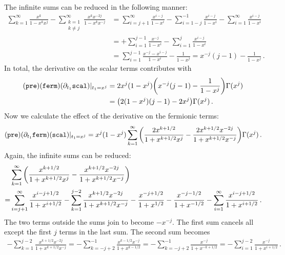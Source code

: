 \documentclass[a4paper,11pt]{article}
\begin{document}
The infinite sums can be reduced in the following manner:
\begin{equation}
\begin{split}
	\sum_{k=1}^\infty \frac{x^k}{1-x^kx^j} - \sum_{\substack{k=1\\k\neq j}}^\infty \frac{x^kx^{-2j}}{1-x^kx^{-j}}
	&= \sum_{i=j+1}^\infty \frac{x^{i-j}}{1-x^i} - \sum_{i=1-j}^{-1} \frac{x^{i-j}}{1-x^i} - \sum_{i=1}^{\infty} \frac{x^{i-j}}{1-x^i}\\
	&= + \sum_{i=1}^{j-1} \frac{x^{-j}}{1-x^i} - \sum_{i=1}^{j} \frac{x^{i-j}}{1-x^i}\\
	&= \sum_{i=1}^{j-1} \frac{x^{-j}-x^{i-j}}{1-x^i} - \frac{1}{1-x^j} = x^{-j}(j-1) - \frac{1}{1-x^j}\,.
\end{split}
\end{equation}
In total, the derivative on the scalar terms contributes with
\begin{equation}
\begin{split}
	(\mathtt{pre})(\mathtt{ferm})(\partial_{t_1}\mathtt{scal})|_{t_1=x^j}&=2x^j(1-x^j) \qty(x^{-j}(j-1) - \frac{1}{1-x^j}) \Gamma(x^j)\\
	&= \qty(2(1-x^j)(j-1) - 2x^j) \Gamma(x^j)\,.
\end{split}
\end{equation}
Now we calculate the effect of the derivative on the fermionic terms:
\begin{equation}
	(\mathtt{pre})(\partial_{t_1}\mathtt{ferm})(\mathtt{scal})|_{t_1=x^j}=x^j(1-x^j) \sum_{k=1}^\infty \qty( \frac{2x^{k+1/2}}{1+x^{k+1/2}x^j} - \frac{2x^{k+1/2}x^{-2j}}{1+x^{k+1/2}x^{-j}} )  \Gamma(x^j)\,.
\end{equation}
Again, the infinite sums can be reduced:
\begin{equation}
\begin{split}
	&\sum_{k=1}^\infty \qty( \frac{x^{k+1/2}}{1+x^{k+1/2}x^j} - \frac{x^{k+1/2}x^{-2j}}{1+x^{k+1/2}x^{-j}} )\\
	= & \sum_{i=j+1}^\infty \frac{x^{i-j+1/2}}{1+x^{i+1/2}} -  \sum_{k=1}^{j-2} \frac{x^{k+1/2}x^{-2j}}{1+x^{k+1/2}x^{-j}} - \frac{x^{-j+1/2}}{1+x^{1/2}} - \frac{x^{-j-1/2}}{1+x^{-1/2}} - \sum_{i=1}^\infty \frac{x^{i-j+1/2}}{1+x^{i+1/2}} \,.
\end{split}
\end{equation}
The two terms outside the sums join to become $-x^{-j}$. 
The first sum cancels all except the first $j$ terms in the last sum. 
The second sum becomes
\begin{equation}
\begin{split}
	-\sum_{k=1}^{j-2} \frac{x^{k+1/2}x^{-2j}}{1+x^{k+1/2}x^{-j}}
	= -\sum_{k=-j+2}^{-1} \frac{x^{k-1/2}x^{-j}}{1+x^{k-1/2}}
	= -\sum_{k=-j+2}^{-1} \frac{x^{-j}}{1+x^{-k+1/2}}
	= -\sum_{i=1}^{j-2} \frac{x^{-j}}{1+x^{i+1/2}}\,.
\end{split}
\end{equation}
\end{document}
